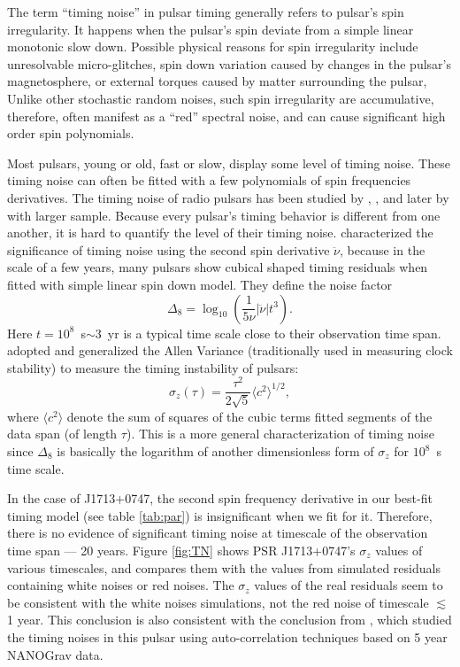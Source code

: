 The term ``timing noise'' in pulsar timing generally refers to pulsar's spin irregularity.
It happens when the pulsar's spin deviate from a simple linear monotonic slow down.
Possible physical reasons for spin irregularity include unresolvable
micro-glitches, spin down variation caused by changes in the pulsar's
magnetosphere, or external torques caused by matter surrounding the pulsar,
Unlike other stochastic random noises, such spin irregularity are
accumulative, therefore, often manifest as a ``red'' spectral noise,
and can cause significant high order spin polynomials.

Most pulsars, young or old, fast or slow, display some level of timing noise.
These timing noise can often be fitted with a few polynomials of spin frequencies derivatives.
The timing noise of radio pulsars has been studied by \citet{antt94},
\citet{dmhd95}, \citet{mtem97} and later by \citet{hlk10} with larger sample. 
Because every pulsar's timing behavior is different from one another, it is
hard to quantify the level of their timing noise.
\citet{antt94} characterized the significance of timing noise using the second
spin derivative $\ddot{\nu}$, because in the scale of a few years, many
pulsars show cubical shaped timing residuals when fitted with simple linear
spin down model.
They define the noise factor 
\begin{equation}
\label{eq:delta8}
\Delta_8 = \log_{10}\left(\frac{1}{5\nu}|\ddot{\nu}|t^3\right).
\end{equation}
Here $t=10^8$~s$\sim 3$~yr is a typical time scale close to their
observation time span.
\citet{mtem97} adopted and generalized the Allen Variance (traditionally used in measuring clock stability) to measure the timing instability of pulsars:
\begin{equation}
\label{eq:sigmaz}
\sigma_z(\tau) = \frac{\tau^2}{2\sqrt{5}}\langle c^2 \rangle^{1/2},
\end{equation}
where $\langle c^2\rangle$ denote the sum of squares of the cubic terms fitted segments of
the data span (of length $\tau$).
This is a more general characterization of timing noise since $\Delta_8$ is
basically the logarithm of another dimensionless form of $\sigma_z$ for
$10^8$~s time scale.

In the case of J1713+0747, the second spin frequency derivative in our
best-fit timing model (see table \ref{tab:par}) is insignificant when we
fit for it. Therefore, there is no evidence of significant timing noise at
timescale of the observation time span --- 20 years. Figure \ref{fig:TN} shows
PSR J1713+0747's $\sigma_z$ values of various timescales, and compares them
with the values from simulated residuals containing white noises or
red noises. The $\sigma_z$ values of the real residuals seem to be consistent 
with the white noises simulations, not the red noise of timescale 
$\lesssim$1 year. This
conclusion is also consistent with the conclusion from \citet{pjl+13}, which 
studied the timing noises in this pulsar using auto-correlation techniques 
based on 5 year NANOGrav data.

